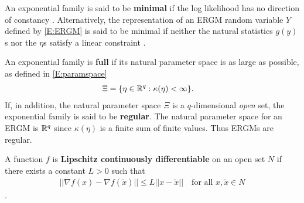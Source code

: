 \begin{definition}
An exponential family is said to be \textbf{minimal} if the log likelihood has no direction of constancy  
\citep{Geyer:2009}.  Alternatively, the representation of an ERGM random variable $Y$ defined by \eqref{E:ERGM} is said to be minimal if neither the natural statistics $g(y)$s nor the $\eta$s satisfy a linear constraint \citep{tpe}.
\end{definition}

\begin{definition}
An exponential family is \textbf{full} if its natural parameter space is as large as possible, as defined in \eqref{E:paramspace} 
\begin{align*}
   \Xi &= \{ \eta \in {\mathbb R}^q : \kappa(\eta) < \infty \}.  
\end{align*}
If, in addition, the natural parameter space $\Xi$ is a $q$-dimensional \textit{open} set, the exponential family is said to be \textbf{regular}.  The natural parameter space for an ERGM is ${\mathbb R}^q$ since $\kappa(\eta)$ is a finite sum of finite values.  Thus ERGMs are regular.
\end{definition}


\begin{definition}
A function $f$ is \textbf{Lipschitz continuously differentiable} on an open set $N$ if there exists a constant $L > 0$ such that
	\begin{align*}
		|| \nabla f(x) - \nabla f(\tilde{x}) || \leq L || x - \tilde{x} || \quad \text{for all $x, \tilde{x} \in N$}
	\end{align*}
	\citep{NW}.
\end{definition}






